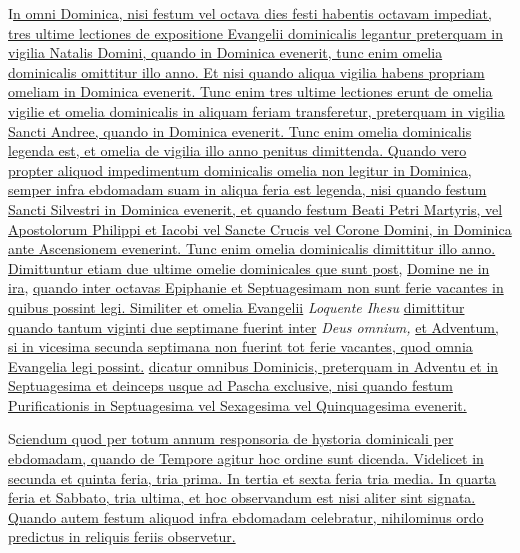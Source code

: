 \begin{multicols*}{2}
{\color{Red} }
\lettrine[lines=2]{\zallmancaps \color{Red} I}{}\ul{n omni Dominica, nisi festum vel octava dies festi habentis octavam impediat, tres ultime lectiones de expositione Evangelii dominicalis legantur preterquam in vigilia Natalis Domini, quando in Dominica evenerit, tunc enim omelia dominicalis omittitur illo anno. Et nisi quando aliqua vigilia habens propriam omeliam in Dominica evenerit. Tunc enim tres ultime lectiones erunt de omelia vigilie et omelia dominicalis in aliquam feriam transferetur, preterquam in vigilia Sancti Andree, quando in Dominica evenerit. Tunc enim omelia dominicalis legenda est, et omelia de vigilia illo anno penitus dimittenda. Quando vero propter aliquod impedimentum dominicalis omelia non legitur in Dominica, semper infra ebdomadam suam in aliqua feria est legenda, nisi quando festum Sancti Silvestri in Dominica evenerit, et quando festum Beati Petri Martyris, vel Apostolorum Philippi et Iacobi vel Sancte Crucis vel Corone Domini, in Dominica ante Ascensionem evenerint. Tunc enim omelia dominicalis dimittitur illo anno. Dimittuntur etiam due ultime omelie dominicales que sunt post,} \hyperlink{domine-ne-in-ira}{Domine ne in ira}, \ul{quando inter octavas Epiphanie et Septuagesimam non sunt ferie vacantes in quibus possint legi. Similiter et omelia Evangelii} \textit{Loquente Ihesu} \ul{dimittitur quando tantum viginti due septimane fuerint inter} \textit{Deus omnium,} \ul{et Adventum, si in vicesima secunda septimana non fuerint tot ferie vacantes, quod omnia Evangelia legi possint.}
 \ul{dicatur omnibus Dominicis, preterquam in Adventu et in Septuagesima et deinceps usque ad Pascha exclusive, nisi quando festum Purificationis in Septuagesima vel Sexagesima vel Quinquagesima evenerit.}

{\color{Red} }
\lettrine[lines=2]{\zallmancaps \color{Blue} S}{}\ul{ciendum quod per totum annum responsoria de hystoria dominicali per ebdomadam, quando de Tempore agitur hoc ordine sunt dicenda. Videlicet in secunda et quinta feria, tria prima. In tertia et sexta feria tria media. In quarta feria et Sabbato, tria ultima, et hoc observandum est nisi aliter sint signata. Quando autem festum aliquod infra ebdomadam celebratur, nihilominus ordo predictus in reliquis feriis observetur.}


\end{multicols*}
